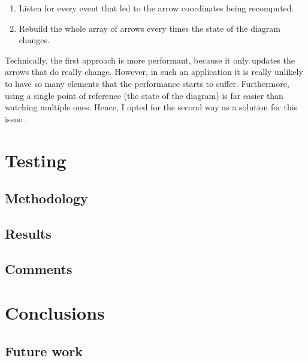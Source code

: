 \documentclass[]{usiinfbachelorproject}
\begin{document}
\begin{enumerate}
	\item Listen for every event that led to the arrow coordinates being recomputed.
	\item Rebuild the whole array of arrows every times the state of the diagram changes.
\end{enumerate}

\noindent Technically, the first approach is more performant, because it only updates the arrows that do really change. However, in such an application it is really unlikely to have so many elements that the performance starts to suffer. Furthermore, using a single point of reference (the state of the diagram) is far easier than watching multiple ones. Hence, I opted for the second way as a solution for this issue \cite{boulay}.


\vspace{\fill}

\pagebreak

\section{Testing} \label{Testing}


\subsection{Methodology}

\subsection{Results}

\subsection{Comments}

\vspace{\fill}

\pagebreak

\section{Conclusions} \label{Conclusions}

\subsection{Future work}

\vspace{\fill}

\pagebreak



\end{document}

